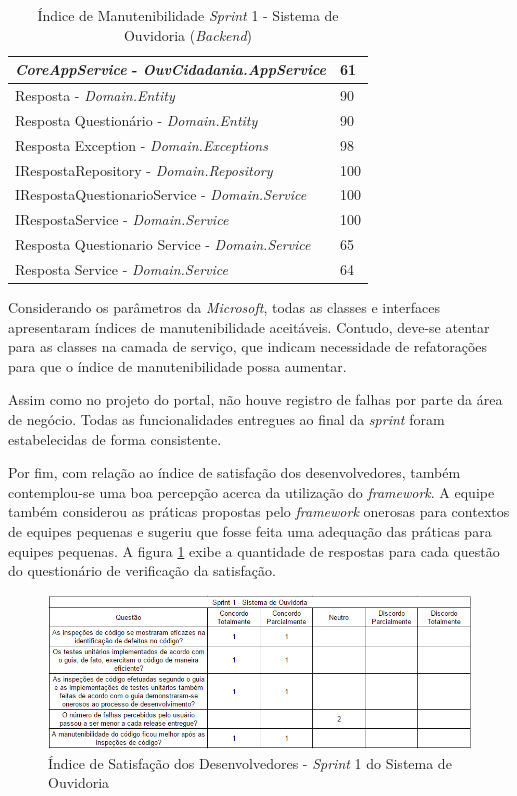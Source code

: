 \begin{table}[h]
\caption{Índice de Manutenibilidade \textit{Sprint} 1 - Sistema de Ouvidoria (\textit{Backend})}
\centering
\begin{tabular}{ | m{12cm} | m{4cm} | } 
\hline
\textit{CoreAppService} - \textit{OuvCidadania.AppService} & 61 \\ 
\hline
Resposta - \textit{Domain.Entity} & 90 \\ 
\hline
Resposta Questionário - \textit{Domain.Entity} & 90 \\ 
\hline
Resposta Exception - \textit{Domain.Exceptions} & 98 \\ 
\hline
IRespostaRepository - \textit{Domain.Repository} & 100 \\
\hline
IRespostaQuestionarioService - \textit{Domain.Service} & 100 \\
\hline
IRespostaService - \textit{Domain.Service} & 100 \\
\hline
Resposta Questionario Service - \textit{Domain.Service} & 65 \\
\hline
Resposta Service - \textit{Domain.Service} & 64 \\
\hline
\end{tabular}
\label{table:tabela6}
\end{table}

Considerando os parâmetros da \textit{Microsoft}, todas as classes e interfaces apresentaram índices de manutenibilidade aceitáveis. Contudo, deve-se atentar para as classes na camada de serviço, que indicam necessidade de refatorações para que o índice de manutenibilidade possa aumentar.

Assim como no projeto do portal, não houve registro de falhas por parte da área de negócio. Todas as funcionalidades entregues ao final da \textit{sprint} foram estabelecidas de forma consistente.

Por fim, com relação ao índice de satisfação dos desenvolvedores, também contemplou-se uma boa percepção acerca da utilização do \textit{framework}. A equipe também considerou as práticas propostas pelo \textit{framework} onerosas para contextos de equipes pequenas e sugeriu que fosse feita uma adequação das práticas para equipes pequenas. A figura \ref{fig:satisfacaoOuvidoria1} exibe a quantidade de respostas para cada questão do questionário de verificação da satisfação.

\begin{figure}[h]
\includegraphics[width=\textwidth]{figuras/isd_ouvdf_1.png}
\caption{Índice de Satisfação dos Desenvolvedores - \textit{Sprint} 1 do Sistema de Ouvidoria}
\label{fig:satisfacaoOuvidoria1}
\end{figure}

